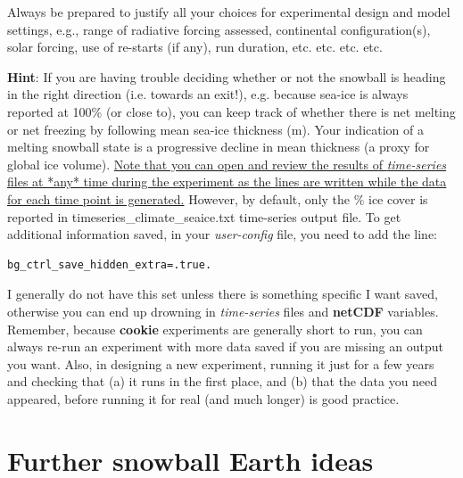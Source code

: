 Always be prepared to justify all your choices for experimental design and model settings, e.g., range of radiative forcing assessed, continental configuration(s), solar forcing, use of re-starts (if any), run duration, etc. etc. etc. etc.

\vspace{1mm}
\noindent \textbf{Hint}: If you are having trouble deciding whether or not the snowball is heading in the right direction (i.e. towards an exit!), e.g. because sea-ice is always reported at 100\% (or close to), you can keep track of whether there is net melting or net freezing by following mean sea-ice thickness (m). Your indication of a melting snowball state is a progressive decline in mean thickness (a proxy for global ice volume). \uline{Note that you can open and review the results of \textit{time-series} files at *any* time during the experiment as the lines are written while the data for each time point is generated.} However, by default, only the \% ice cover is reported in \textsf{\footnotesize timeseries\_climate\_seaice.txt} time-series output file. To get additional information saved, in your \textit{user-config} file, you need to add the line:

\vspace{-1mm}\small\begin{verbatim}
bg_ctrl_save_hidden_extra=.true.
\end{verbatim}\normalsize\vspace{-1mm}

I generally do not have this set unless there is something specific I want saved, otherwise you can end up drowning in \textit{time-series} files and \textbf{netCDF} variables. Remember, because \textbf{cookie} experiments are generally short to run, you can always re-run an experiment with more data saved if you are missing an output you want. Also, in designing a new experiment, running it just for a few years and checking that (a) it runs in the first place, and (b) that the data you need appeared, before running it for real (and much longer) is good practice.

\newpage

\section{Further snowball Earth ideas}


